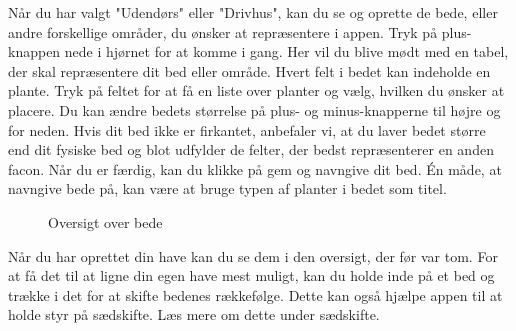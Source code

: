 \begin{minipage}{0.55\textwidth}    
Når du har valgt "Udendørs" eller "Drivhus", kan du se og oprette de bede, eller andre forskellige områder, du ønsker at repræsentere i appen. Tryk på plus-knappen nede i hjørnet for at komme i gang.
Her vil du blive mødt med en tabel, der skal repræsentere dit bed eller område. Hvert felt i bedet kan indeholde en plante. Tryk på feltet for at få en liste over planter og vælg, hvilken du ønsker at placere. Du kan ændre bedets størrelse på plus- og minus-knapperne til højre og for neden. Hvis dit bed ikke er firkantet, anbefaler vi, at du laver bedet større end dit fysiske bed og blot udfylder de felter, der bedst repræsenterer en anden facon. Når du er færdig, kan du klikke på gem og navngive dit bed. Én måde, at navngive bede på, kan være at bruge typen af planter i bedet som titel.
\end{minipage} 

\begin{minipage}{0.4\textwidth}
\begin{figure}[H]
    \centering
    \caption{Oversigt over bede}
\end{figure}
\end{minipage} \hfill
\begin{minipage}{0.5\textwidth}
Når du har oprettet din have kan du se dem i den oversigt, der før var tom.
For at få det til at ligne din egen have mest muligt, kan du holde inde på et bed og trække i det for at skifte bedenes rækkefølge. Dette kan også hjælpe appen til at holde styr på sædskifte. Læs mere om dette under sædskifte.
\end{minipage}

